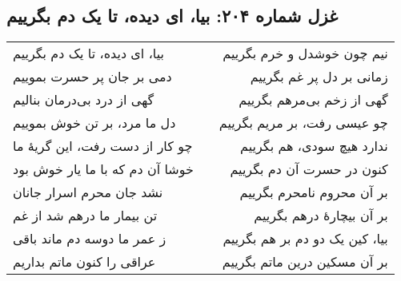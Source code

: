 \begin{center}
\section*{غزل شماره ۲۰۴: بیا، ای دیده، تا یک دم بگرییم}
\label{sec:204}
\begin{longtable}{l p{0.5cm} r}
بیا، ای دیده، تا یک دم بگرییم
&&
نیم چون خوشدل و خرم بگرییم
\\
دمی بر جان پر حسرت بموییم
&&
زمانی بر دل پر غم بگرییم
\\
گهی از درد بی‌درمان بنالیم
&&
گهی از زخم بی‌مرهم بگرییم
\\
دل ما مرد، بر تن خوش بموییم
&&
چو عیسی رفت، بر مریم بگرییم
\\
چو کار از دست رفت، این گریهٔ ما
&&
ندارد هیچ سودی، هم بگرییم
\\
خوشا آن دم که با ما یار خوش بود
&&
کنون در حسرت آن دم بگرییم
\\
نشد جان محرم اسرار جانان
&&
بر آن محروم نامحرم بگرییم
\\
تن بیمار ما درهم شد از غم
&&
بر آن بیچارهٔ درهم بگرییم
\\
ز عمر ما دوسه دم ماند باقی
&&
بیا، کین یک دو دم بر هم بگرییم
\\
عراقی را کنون ماتم بداریم
&&
بر آن مسکین درین ماتم بگرییم
\\
\end{longtable}
\end{center}
